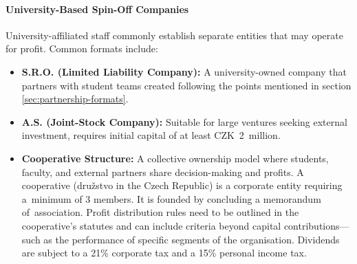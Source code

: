 \paragraph{University-Based Spin-Off Companies}
University-affiliated staff commonly establish separate entities that may operate for profit. Common formats include:
\begin{itemize}
    \item \textbf{S.R.O. (Limited Liability Company):} A university-owned company that partners with student teams created following the points mentioned in section \ref{sec:partnership-formats}.
    \item \textbf{A.S. (Joint-Stock Company):} Suitable for large ventures seeking external investment, requires initial capital of at least CZK~2~million. \cite{jake-obchodni-spolecnosti}
    \item \textbf{Cooperative Structure:} A collective ownership model where students, faculty, and external partners share decision-making and profits. A cooperative (družstvo in the Czech Republic) is a corporate entity requiring a~minimum of 3 members. It is founded by concluding a memorandum of~association. Profit distribution rules need to be outlined in the cooperative’s statutes and can include criteria beyond capital contributions---such as the performance of specific segments of the organisation. Dividends are subject to a 21\% corporate tax and a 15\% personal income tax. \cite{preuss-coop, team-coop, businessinfo-coop}
\end{itemize}
